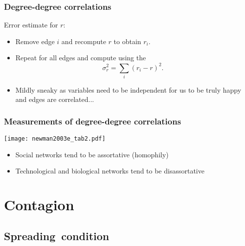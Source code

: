 \begin{frame}
  \frametitle{Degree-degree correlations}
  
  \begin{block}{Error estimate for $r$:}
    \begin{itemize}
    \item<1->
      Remove edge $i$ and recompute $r$ 
      to obtain $r_i$.
    \item<2->
      Repeat for all edges and compute
      using the 
      \cite{efron1981a}
      $$
      \sigma_r^2 
      =
      \sum_{i} (r_i - r)^2.
      $$
    \item<3-> Mildly sneaky as variables need to be
      independent for us to be truly happy and edges
      are correlated...
    \end{itemize}
  \end{block}

\end{frame}


\begin{frame}
  \frametitle{Measurements of degree-degree correlations}
  
  \texttt{[image: newman2003e\_tab2.pdf]}

  \begin{itemize}
  \item Social networks tend to be assortative (homophily)
  \item Technological and biological networks tend to be disassortative
  \end{itemize}

\end{frame}




\section{Contagion}

\subsection{Spreading\ condition}

